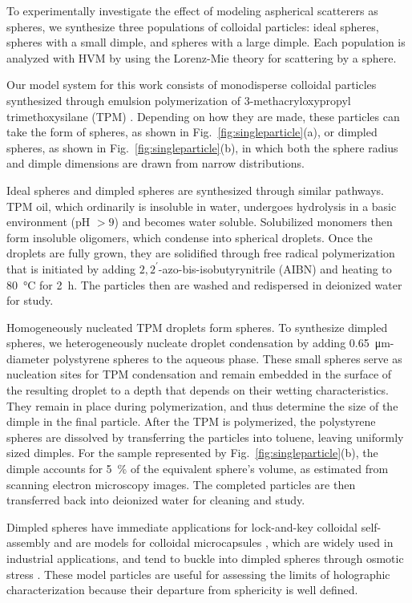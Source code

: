 To experimentally investigate the effect of modeling aspherical scatterers
as spheres, we synthesize three populations of colloidal particles: ideal spheres,
spheres with a small dimple, and spheres with a large dimple.
Each population is analyzed with HVM by using the Lorenz-Mie theory
for scattering by a sphere.

Our model system for this work consists of monodisperse
colloidal particles synthesized through emulsion polymerization of
3-methacryloxypropyl trimethoxysilane (TPM) \cite{sacanna13}.
Depending on how they are made, these particles can take the form
of spheres, as shown in Fig.~\ref{fig:singleparticle}(a), or dimpled
spheres, as shown in Fig.~\ref{fig:singleparticle}(b), in which both
the sphere radius and dimple dimensions are drawn from narrow
distributions. 

Ideal spheres and dimpled spheres are synthesized through similar pathways.
TPM oil, which ordinarily is insoluble in water,
undergoes hydrolysis in a basic environment (pH $> 9$) and becomes
water soluble.
Solubilized monomers then form insoluble oligomers,
which condense into spherical droplets.
Once the droplets are fully grown, they are solidified through
free radical polymerization that is initiated by adding 
$2,2^\prime$-azo-bis-isobutyrynitrile (AIBN) and 
heating to \SI{80}{\degreeCelsius} for 
\SI{2}{\hour}.
The particles then are washed and redispersed in deionized water
for study.

Homogeneously nucleated TPM droplets form spheres.
To synthesize dimpled spheres, we heterogeneously nucleate
droplet condensation by adding \SI{0.65}{\um}-diameter
polystyrene spheres to the aqueous phase.
These small spheres serve as nucleation sites for TPM condensation and remain
embedded in the surface of the resulting droplet to a depth that
depends on their wetting characteristics.
They remain in place during polymerization, and thus
determine the size of the dimple in the final particle. 
After the TPM is polymerized, the polystyrene spheres are
dissolved by transferring the particles into toluene, leaving
uniformly sized dimples.
For the sample represented by Fig.~\ref{fig:singleparticle}(b), the
dimple accounts for \SI{5}{\percent} of the equivalent sphere's
volume, as estimated from scanning electron microscopy images.
The completed particles are then transferred back into 
deionized water for cleaning and study.

Dimpled spheres have immediate applications for lock-and-key
colloidal self-assembly
\cite{sacanna10,macfarlane10,sacanna11,ashton13,phillips14,wang14} 
and are models for colloidal microcapsules \cite{chang64}, which are widely
used in industrial applications, and tend to buckle into dimpled spheres
through osmotic stress \cite{chang64,knoche11,jose14}. 
These model particles are useful for assessing the limits of holographic
characterization because their departure from sphericity is well defined.

